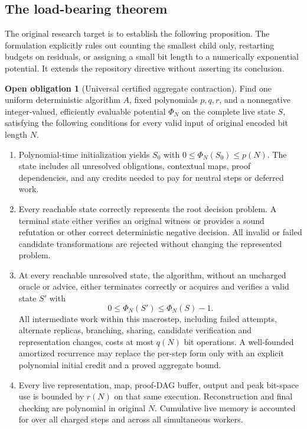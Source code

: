\documentclass[11pt,letterpaper]{article}
\theoremstyle{definition}
\newtheorem{obligation}[theorem]{Open obligation}
\begin{document}
\subsection{The load-bearing theorem}
The original research target is to establish the following proposition. The formulation explicitly rules out counting the smallest child only, restarting budgets on residuals, or assigning a small bit length to a numerically exponential potential. It extends the repository directive \cite{ebdirective} without asserting its conclusion.
\begin{obligation}[Universal certified aggregate contraction]\label{obl:universal}
Find one uniform deterministic algorithm \(A\), fixed polynomials \(p,q,r\), and a nonnegative integer-valued, efficiently evaluable potential \(\Phi_N\) on the complete live state \(S\), satisfying the following conditions for every valid input of original encoded bit length \(N\).
\begin{enumerate}
 \item[\textnormal{(U1)}] Polynomial-time initialization yields \(S_0\) with \(0\le\Phi_N(S_0)\le p(N)\). The state includes all unresolved obligations, contextual maps, proof dependencies, and any credits needed to pay for neutral steps or deferred work.
 \item[\textnormal{(U2)}] Every reachable state correctly represents the root decision problem. A terminal state either verifies an original witness or provides a sound refutation or other correct deterministic negative decision. All invalid or failed candidate transformations are rejected without changing the represented problem.
 \item[\textnormal{(U3)}] At every reachable unresolved state, the algorithm, without an uncharged oracle or advice, either terminates correctly or acquires and verifies a valid state \(S'\) with
 \begin{equation}\label{eq:decrease}
 0\le\Phi_N(S')\le\Phi_N(S)-1.
 \end{equation}
 All intermediate work within this macrostep, including failed attempts, alternate replicas, branching, sharing, candidate verification and representation changes, costs at most \(q(N)\) bit operations. A well-founded amortized recurrence may replace the per-step form only with an explicit polynomial initial credit and a proved aggregate bound.
 \item[\textnormal{(U4)}] Every live representation, map, proof-DAG buffer, output and peak bit-space use is bounded by \(r(N)\) on that same execution. Reconstruction and final checking are polynomial in original \(N\). Cumulative live memory is accounted for over all charged steps and across all simultaneous workers.
\end{enumerate}
\end{obligation}
\end{document}

